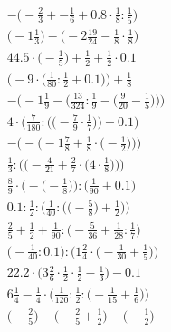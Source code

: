 \documentclass[8pt]{article}
\begin{document}
\begin{align}
-\big(-\frac{2}{3} + -\frac{1}{6} + 0.8 \cdot \frac{1}{8} : \frac{1}{5}\big) \\
\big(-1\frac{1}{3}\big) - \big(-2\frac{19}{24} - \frac{1}{8} \cdot \frac{1}{8}\big) \\
44.5 \cdot \big(-\frac{1}{5}\big) + \frac{1}{2} + \frac{1}{2} \cdot 0.1 \\
\Big(-9 \cdot \big(\frac{1}{80} : \frac{1}{2} + 0.1\big)\Big) + \frac{1}{8} \\
-\bigg(-1\frac{1}{9} - \Big(\frac{13}{324} : \frac{1}{9} - \big(\frac{9}{20} - \frac{1}{5}\big)\Big)\bigg) \\
4 \cdot \bigg(\frac{7}{180} : \Big(\big(-\frac{7}{9} \cdot \frac{1}{7}\big)\Big) - 0.1\bigg) \\
-\bigg(-\Big(-1\frac{7}{8} + \frac{1}{8} \cdot \big(-\frac{1}{2}\big)\Big)\bigg) \\
\frac{1}{3} : \bigg(\Big(-\frac{4}{21} + \frac{2}{7} \cdot \big(4 \cdot \frac{1}{8}\big)\Big)\bigg) \\
\frac{8}{9} \cdot \Big(-\big(-\frac{1}{8}\big)\Big) : \Big(\frac{1}{90} + 0.1\Big) \\
0.1 : \frac{1}{2} : \bigg(\frac{1}{40} : \Big(\big(-\frac{5}{8}\big) + \frac{1}{2}\Big)\bigg) \\
\frac{2}{5} + \frac{1}{2} + \frac{1}{90} : \big(-\frac{5}{36} + \frac{1}{28} : \frac{1}{7}\big) \\
\Big(-\frac{1}{40} : 0.1\Big) : \Big(1\frac{2}{4} \cdot \big(-\frac{1}{30} + \frac{1}{5}\big)\Big) \\
22.2 \cdot \big(3\frac{2}{6} \cdot \frac{1}{2} \cdot \frac{1}{2} - \frac{1}{3}\big) - 0.1 \\
6\frac{1}{4} - \frac{1}{4} \cdot \Big(\frac{1}{120} : \frac{1}{2} : \big(-\frac{1}{15} + \frac{1}{6}\big)\Big) \\
\big(-\frac{2}{5}\big) - \big(-\frac{2}{5} + \frac{1}{2}\big) - \big(-\frac{1}{2}\big)
\end{align}
\end{document}
